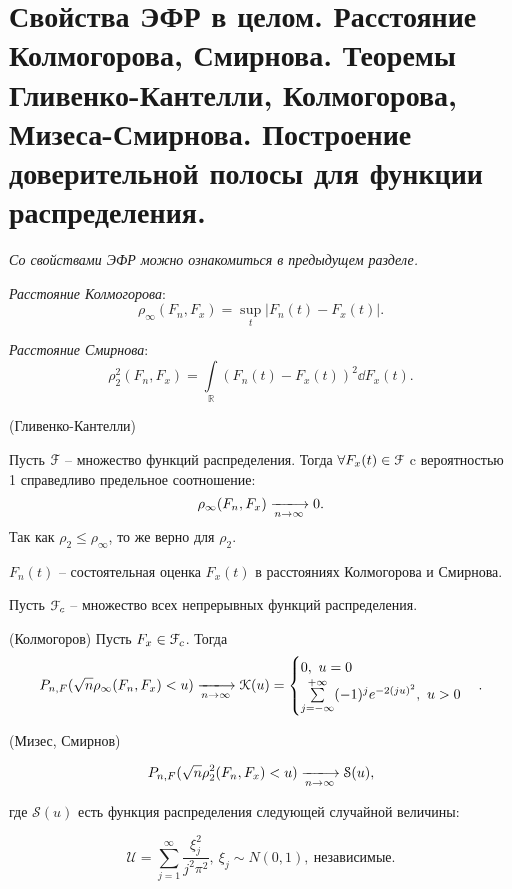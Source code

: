 \section{Свойства ЭФР в целом. Расстояние Колмогорова, Смирнова. Теоремы
Гливенко-Кантелли, Колмогорова, Мизеса-Смирнова. Построение доверительной
полосы для функции распределения.}

\textit{Со свойствами ЭФР можно ознакомиться в предыдущем разделе.}

\begin{definition}
  \textit{Расстояние Колмогорова}:
  \[
    \rho_{\infty} (F_n, F_x) = \sup_{t}|F_n(t) - F_x(t)|
  .\]
\end{definition}

\begin{definition}
  \textit{Расстояние Смирнова}:
  \[
    \rho^{2}_{2} (F_n, F_x) = \int\limits_{\mathbb{R}}(F_n(t) - F_x(t))^2
    \dd F_x(t)
  .\]
\end{definition}

\begin{theorem}(Гливенко-Кантелли)

  Пусть $\mathcal{F}$ -- множество функций распределения.
  Тогда $\forall F_x(t) \in \mathcal{F}$ c вероятностью 1 справедливо предельное
  соотношение:
  \[
    \rho_{\infty} (F_n, F_x) \xlongrightarrow[n \to \infty]{} 0
  .\]
  Так как $\rho_2 \leqslant \rho_{\infty}$, то же верно для $\rho_2$.

\end{theorem}

\begin{remark}
  $F_n(t)$ -- состоятельная оценка $F_x(t)$ в расстояниях Колмогорова и
  Смирнова.
\end{remark}

Пусть $\mathcal{F}_c$ -- множество всех непрерывных функций распределения.

\begin{theorem}(Колмогоров)
    Пусть $F_x \in \mathcal{F}_c$. Тогда
  \[
    P_{n, F}(\sqrt{n} \rho_{\infty} (F_n, F_x) < u)
    \xlongrightarrow[n \to \infty]{} \mathcal{K}(u) = \begin{cases}
      0,~ u = 0\\
      \sum\limits_{j = -\infty}^{+\infty} (-1)^j e^{-2 (ju)^2},~ u > 0
    \end{cases}
  .\]

\end{theorem}

\begin{theorem}(Мизес, Смирнов)

  \[
    P_{n, F}(\sqrt{n} \rho^{2}_{2} (F_n, F_x) < u)
    \xlongrightarrow[n \to \infty]{} \mathcal{S}(u)
  ,\]

  где $\mathcal{S}(u)$ есть функция распределения следующей случайной величины:

  \[
    \mathcal{U} = \sum\limits_{j = 1}^{\infty} \frac{\xi^2_j}{j^2 \pi^2},~
    \xi_j \sim N(0, 1),~ \text{независимые}
  .\]

\end{theorem}

